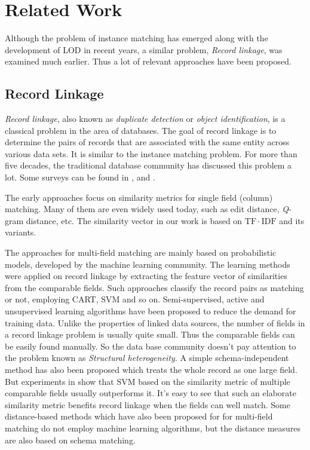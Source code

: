 \section{Related Work}
\label{sec:related}

Although the problem of instance matching has emerged along with the development of LOD in recent years, a similar problem, \textit{Record linkage}, was examined much earlier. Thus a lot of relevant approaches have been proposed.

\subsection{Record Linkage}

\textit{Record linkage}, also known as \textit{duplicate detection} or \textit{object identification}, is a classical problem in the area of databases. The goal of record linkage is to determine the pairs of records that are associated with the same entity across various data sets. It is similar to the instance matching problem. For more than five decades, the traditional database community has discussed this problem a lot. Some surveys can be found in \cite{winkler1999state}, \cite{winkler2006overview} and \cite{elmagarmid2007duplicate}.

The early approaches focus on similarity metrics for single field (column) matching. Many of them are even widely used today, such as edit distance, \textit{Q}-gram distance, etc. The similarity vector in our work is based on $\mathrm{TF}\cdot\mathrm{IDF}$\cite{cohen1998integration} and its variants.

The approaches for multi-field matching are mainly based on probabilistic models, developed by the machine learning community. The learning methods were applied on record linkage by extracting the feature vector of similarities from the comparable fields. Such approaches classify the record pairs as matching or not, employing CART\cite{cochinwala2001efficient}, SVM\cite{bilenko2003adaptive} and so on. Semi-supervised, active and unsupervised learning algorithms have been proposed to reduce the demand for training data. Unlike the properties of linked data sources, the number of fields in a record linkage problem is usually quite small. Thus the comparable fields can be easily found manually. So the data base community doesn't pay attention to the problem known as \textit{Structural heterogeneity}. A simple schema-independent method has also been proposed which treats the whole record as one large field. But experiments in \cite{bilenko2003adaptive} show that SVM based on the similarity metric of multiple comparable fields usually outperforms it. It's easy to see that such an elaborate similarity metric benefits record linkage when the fields can well match. Some distance-based methods which have also been proposed for for multi-field matching do not employ machine learning algorithms\cite{guha2004merging}\cite{ananthakrishna2002eliminating}, but the distance measures are also based on schema matching.

